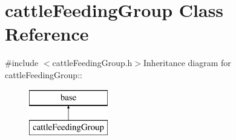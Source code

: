 \hypertarget{classcattle_feeding_group}{
\section{cattleFeedingGroup Class Reference}
\label{classcattle_feeding_group}
}


{\ttfamily \#include $<$cattleFeedingGroup.h$>$}Inheritance diagram for cattleFeedingGroup::\begin{figure}[H]
\begin{center}
\leavevmode
\includegraphics[height=2cm]{classcattle_feeding_group}
\end{center}
\end{figure}
